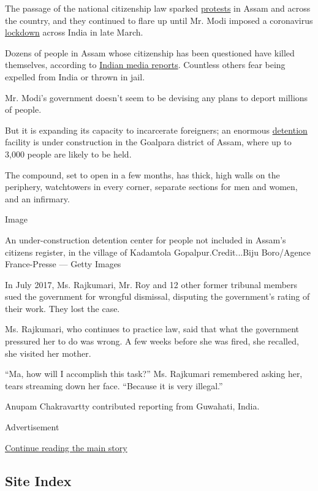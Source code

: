 The passage of the national citizenship law sparked
\href{https://www.nytimes.com/video/world/100000006877118/protests-india.html}{protests}
in Assam and across the country, and they continued to flare up until
Mr. Modi imposed a coronavirus
\href{https://www.nytimes.com/2020/03/24/world/asia/india-coronavirus-lockdown.html}{lockdown}
across India in late March.

Dozens of people in Assam whose citizenship has been questioned have
killed themselves, according to
\href{https://www.thecitizen.in/index.php/en/NewsDetail/index/15/18425/Suicides-over-the-NRC--Trend-Analysis}{Indian
media reports}. Countless others fear being expelled from India or
thrown in jail.

Mr. Modi's government doesn't seem to be devising any plans to deport
millions of people.

But it is expanding its capacity to incarcerate foreigners; an enormous
\href{https://www.nytimes.com/2019/08/17/world/asia/india-muslims-narendra-modi.html}{detention}
facility is under construction in the Goalpara district of Assam, where
up to 3,000 people are likely to be held.

The compound, set to open in a few months, has thick, high walls on the
periphery, watchtowers in every corner, separate sections for men and
women, and an infirmary.

Image

An under-construction detention center for people not included in
Assam's citizens register, in the village of Kadamtola
Gopalpur.Credit...Biju Boro/Agence France-Presse --- Getty Images

In July 2017, Ms. Rajkumari, Mr. Roy and 12 other former tribunal
members sued the government for wrongful dismissal, disputing the
government's rating of their work. They lost the case.

Ms. Rajkumari, who continues to practice law, said that what the
government pressured her to do was wrong. A few weeks before she was
fired, she recalled, she visited her mother.

``Ma, how will I accomplish this task?'' Ms. Rajkumari remembered asking
her, tears streaming down her face. ``Because it is very illegal.''

Anupam Chakravartty contributed reporting from Guwahati, India.

Advertisement

\protect\hyperlink{after-bottom}{Continue reading the main story}

\hypertarget{site-index}{%
\subsection{Site Index}\label{site-index}}

